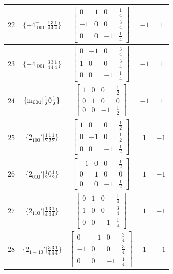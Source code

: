 \documentclass[fleqn,8pt]{jsarticle}
\begin{document}
\begin{longtable}{ccccc}
$ 22 $ & $ \{-4^{+}_{\,\,001}|\frac{1}{4} \frac{3}{4} \frac{1}{4}\} $ & $ \begin{bmatrix} 0 & 1 & 0 & \frac{1}{4} \\ -1 & 0 & 0 & \frac{3}{4} \\ 0 & 0 & -1 & \frac{1}{4} \end{bmatrix} $ & $ -1 $ & $ 1 $ \\ \hline
$ 23 $ & $ \{-4^{-}_{\,\,001}|\frac{3}{4} \frac{3}{4} \frac{1}{4}\} $ & $ \begin{bmatrix} 0 & -1 & 0 & \frac{3}{4} \\ 1 & 0 & 0 & \frac{3}{4} \\ 0 & 0 & -1 & \frac{1}{4} \end{bmatrix} $ & $ -1 $ & $ 1 $ \\ \hline
$ 24 $ & $ \{{\rm m}_{001}|\frac{1}{2} 0 \frac{1}{2}\} $ & $ \begin{bmatrix} 1 & 0 & 0 & \frac{1}{2} \\ 0 & 1 & 0 & 0 \\ 0 & 0 & -1 & \frac{1}{2} \end{bmatrix} $ & $ -1 $ & $ 1 $ \\ \hline
$ 25 $ & $ \{2{}_{100}{}'|\frac{1}{2} \frac{1}{2} \frac{1}{2}\} $ & $ \begin{bmatrix} 1 & 0 & 0 & \frac{1}{2} \\ 0 & -1 & 0 & \frac{1}{2} \\ 0 & 0 & -1 & \frac{1}{2} \end{bmatrix} $ & $ 1 $ & $ -1 $ \\ \hline
$ 26 $ & $ \{2{}_{010}{}'|\frac{1}{2} 0 \frac{1}{2}\} $ & $ \begin{bmatrix} -1 & 0 & 0 & \frac{1}{2} \\ 0 & 1 & 0 & 0 \\ 0 & 0 & -1 & \frac{1}{2} \end{bmatrix} $ & $ 1 $ & $ -1 $ \\ \hline
$ 27 $ & $ \{2{}_{110}{}'|\frac{1}{4} \frac{3}{4} \frac{1}{4}\} $ & $ \begin{bmatrix} 0 & 1 & 0 & \frac{1}{4} \\ 1 & 0 & 0 & \frac{3}{4} \\ 0 & 0 & -1 & \frac{1}{4} \end{bmatrix} $ & $ 1 $ & $ -1 $ \\ \hline
$ 28 $ & $ \{2{}_{1-10}{}'|\frac{3}{4} \frac{3}{4} \frac{1}{4}\} $ & $ \begin{bmatrix} 0 & -1 & 0 & \frac{3}{4} \\ -1 & 0 & 0 & \frac{3}{4} \\ 0 & 0 & -1 & \frac{1}{4} \end{bmatrix} $ & $ 1 $ & $ -1 $ \\ \hline

\end{longtable}
\end{document}
